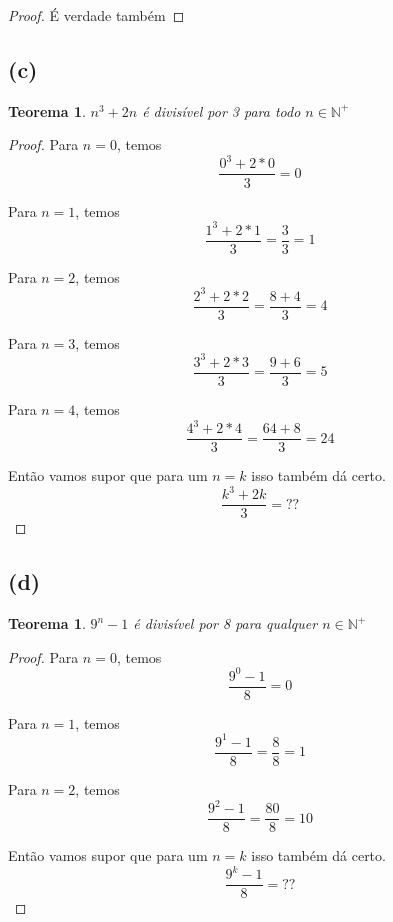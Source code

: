 \documentclass{article}
\begin{document}
\begin{proof}
	É verdade também
\end{proof}

\subsection*{(c)}
\newtheorem{teo3}{Teorema}
\begin{teo3}
	$n^3 + 2n$ é divisível por 3 para todo $n \in \mathbb{N^+}$
\end{teo3}
\begin{proof}
	Para $n = 0$, temos
	\begin{equation}
		\dfrac{0^3 + 2*0}{3} = 0
	\end{equation}

	Para $n = 1$, temos
	\begin{equation}
		\dfrac{1^3 + 2*1}{3} = \dfrac{3}{3} = 1
	\end{equation}

	Para $n = 2$, temos
	\begin{equation}
		\dfrac{2^3 + 2*2}{3} = \dfrac{8 + 4}{3} = 4
	\end{equation}

	Para $n = 3$, temos
	\begin{equation}
		\dfrac{3^3 + 2*3}{3} = \dfrac{9 + 6}{3} = 5
	\end{equation}

	Para $n = 4$, temos
	\begin{equation}
		\dfrac{4^3 + 2*4}{3} = \dfrac{64 + 8}{3} = 24
	\end{equation}

	Então vamos supor que para um $n = k$ isso também dá certo.
	\begin{equation}
		\dfrac{k^3 + 2k}{3} = ??
	\end{equation}
\end{proof}

\subsection*{(d)}
\newtheorem{teo4}{Teorema}
\begin{teo4}
	$9^n - 1$ é divisível por 8 para qualquer $n \in \mathbb{N^+}$ 
\end{teo4}
\begin{proof}
	Para $n = 0$, temos
	\begin{equation}
		\dfrac{9^0 - 1}{8} = 0
	\end{equation}

	Para $n = 1$, temos
	\begin{equation}
		\dfrac{9^1 - 1}{8} = \dfrac{8}{8} = 1
	\end{equation}

	Para $n = 2$, temos
	\begin{equation}
		\dfrac{9^2 - 1}{8} = \dfrac{80}{8} = 10
	\end{equation}

	Então vamos supor que para um $n = k$ isso também dá certo.
	\begin{equation}
		\dfrac{9^k - 1}{8} = ??
	\end{equation}
\end{proof}
\end{document}
